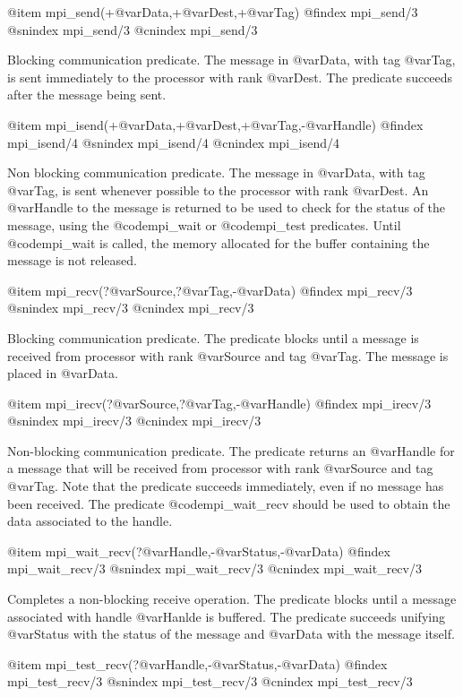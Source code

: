 {{{{{{{{@item mpi_send(+@var{Data},+@var{Dest},+@var{Tag})
@findex mpi_send/3
@snindex mpi_send/3
@cnindex mpi_send/3

Blocking communication predicate. The message in @var{Data}, with tag
@var{Tag}, is sent immediately to the processor with rank @var{Dest}.
The predicate succeeds after the message being sent.



@item mpi_isend(+@var{Data},+@var{Dest},+@var{Tag},-@var{Handle})
@findex mpi_isend/4
@snindex mpi_isend/4
@cnindex mpi_isend/4

Non blocking communication predicate. The message in @var{Data}, with
tag @var{Tag}, is sent whenever possible to the processor with rank
@var{Dest}. An @var{Handle} to the message is returned to be used to
check for the status of the message, using the @code{mpi_wait} or
@code{mpi_test} predicates. Until @code{mpi_wait} is called, the
memory allocated for the buffer containing the message is not
released.

@item mpi_recv(?@var{Source},?@var{Tag},-@var{Data})
@findex mpi_recv/3
@snindex mpi_recv/3
@cnindex mpi_recv/3

Blocking communication predicate. The predicate blocks until a message
is received from processor with rank @var{Source} and tag @var{Tag}.
The message is placed in @var{Data}.

@item mpi_irecv(?@var{Source},?@var{Tag},-@var{Handle})
@findex mpi_irecv/3
@snindex mpi_irecv/3
@cnindex mpi_irecv/3

Non-blocking communication predicate. The predicate returns an
@var{Handle} for a message that will be received from processor with
rank @var{Source} and tag @var{Tag}. Note that the predicate succeeds
immediately, even if no message has been received. The predicate
@code{mpi_wait_recv} should be used to obtain the data associated to
the handle.

@item mpi_wait_recv(?@var{Handle},-@var{Status},-@var{Data})
@findex mpi_wait_recv/3
@snindex mpi_wait_recv/3
@cnindex mpi_wait_recv/3

Completes a non-blocking receive operation. The predicate blocks until
a message associated with handle @var{Hanlde} is buffered. The
predicate succeeds unifying @var{Status} with the status of the
message and @var{Data} with the message itself. 

@item mpi_test_recv(?@var{Handle},-@var{Status},-@var{Data})
@findex mpi_test_recv/3
@snindex mpi_test_recv/3
@cnindex mpi_test_recv/3

}}}}}}}}
